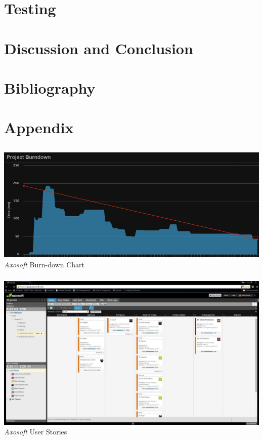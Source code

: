 \documentclass[a4paper]{report}
\begin{document}
\chapter{Testing}
\chapter{Discussion and Conclusion}
\chapter{Bibliography}
\appendix
\chapter{Appendix}
\section{}
\subsection{}
	\includegraphics[width=1.0\linewidth]{./appendixImages/AxosoftScreenShot01}
	\textit{Axosoft} Burn-down Chart 
\subsection{}
	\includegraphics[width=1.0\linewidth]{./appendixImages/AxosoftScreenShot02}
	\textit{Axosoft} User Stories
\pagebreak
\section{}
\pagebreak
\section{}
\pagebreak
\section{}
\pagebreak
\section{}
\end{document}
